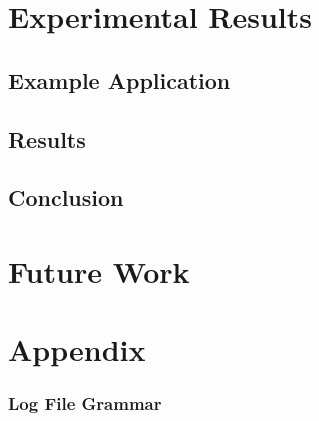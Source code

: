 \documentclass[a4paper,twoside,10pt]{report}
\begin{document}
\addtolength{\parskip}{-0.5\baselineskip} %
\tableofcontents

\newpage


\addtolength{\parskip}{0.5\baselineskip} %







\chapter{Experimental Results}
\section{Example Application}
\section{Results}
\section{Conclusion}

\chapter{Future Work}
\chapter{Appendix}

\subsection{Log File Grammar}
\end{document}

